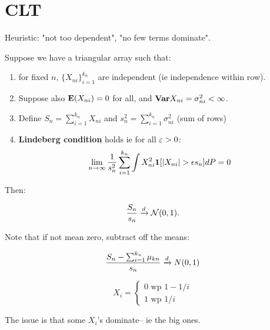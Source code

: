 \documentclass{article}
\begin{document}
\section{CLT}
Heuristic: "not too dependent", "no few terms dominate". 
\begin{theorem}
Suppose we have a triangular array such that:

\begin{enumerate}
	\item  for fixed $n$, $\{X_{ni}\}_{i=1}^{k_n}$ are independent (ie independence within row). 
	\item Suppose also $\mathbf{E} (X_{ni}) = 0$ for all, and $\mathbf{Var} X_{ni} = \sigma^2_{ni} <\infty$.
	\item Define $S_n = \sum_{i=1}^{k_n} X_{ni}$ and $s_n^2 = \sum_{i=1}^{k_n} \sigma^2_{ni}$ (sum of rows)
	\item \textbf{Lindeberg condition} holds ie for all $\varepsilon>0$:
	$$\lim_{n\to \infty} \frac{1}{s_n^2} \sum_{i=1}^{k_n} \int X_{ni}^2 \boldsymbol{1}[ |X_{ni} | >\epsilon s_n ] dP = 0$$
\end{enumerate}  

Then:

$$\frac{S_n}{s_n} \xrightarrow{d} \mathcal N(0,1).$$

Note that if not mean zero, subtract off the means:

$$\frac{S_n - \sum_{i=1}^{k_n} \mu_{kn}}{s_n} \xrightarrow{d} N(0,1)$$

\end{theorem}

\begin{example}
$$X_i = \begin{cases}
	0 \text{ wp } 1-1/i\\
		1 \text{ wp } 1/i
		\end{cases}$$
		
The issue is that some $X_i$'s  dominate-- ie the big ones.
\end{example}

\begin{example}
\end{example}
\end{document}
